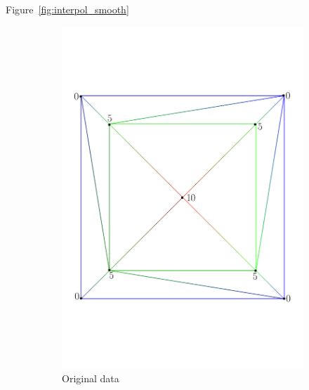 %

Figure~\ref{fig:interpol_smooth}
\begin{figure}
  \centering
  \begin{subfigure}[b]{0.3\linewidth}
    \centering
    \includegraphics[width=\textwidth]{figs/pyramid_o_tr}
    \caption{Original data}
  \end{subfigure}  
  \quad
  \begin{subfigure}[b]{0.3\linewidth}
    \centering

\end{subfigure}
\end{figure}

